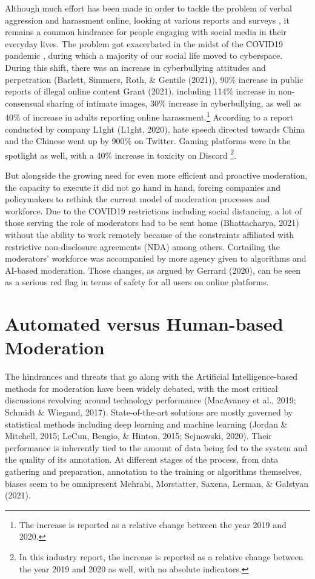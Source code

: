 \documentclass[
  10pt,
  dvipsnames,enabledeprecatedfontcommands]{scrartcl}
\begin{document}
Although much effort has been made in order to tackle the problem of
verbal aggression and harassment online, looking at various reports and
surveys , it remains a common hindrance for people engaging
with social media in their everyday lives. The problem got exacerbated
in the midst of the COVID19 pandemic ,
during which a majority of our social life moved to cyberspace. During
this shift, there was an increase in cyberbullying attitudes and
perpetration (Barlett, Simmers, Roth, \& Gentile (2021)), 90\% increase
in public reports of illegal online content Grant (2021), including
114\% increase in non-consensual sharing of intimate images, 30\%
increase in cyberbullying, as well as 40\% of increase in adults
reporting online
harassment.\footnote{The increase is reported as a relative change between the year 2019 and 2020.}
According to a report conducted by company L1ght (L1ght, 2020), hate
speech directed towards China and the Chinese went up by 900\% on
Twitter. Gaming platforms were in the spotlight as well, with a 40\%
increase in toxicity on Discord
\footnote{In this industry report, the increase is reported as a relative change between the year 2019 and 2020 as well, with no absolute indicators.}.

But alongside the growing need for even more efficient and proactive
moderation, the capacity to execute it did not go hand in hand, forcing
companies and policymakers to rethink the current model of moderation
processes and workforce. Due to the COVID19 restrictions including
social distancing, a lot of those serving the role of moderators had to
be sent home (Bhattacharya, 2021) without the ability to work remotely
because of the constraints affiliated with restrictive non-disclosure
agreements (NDA) among others. Curtailing the moderators' workforce was
accompanied by more agency given to algorithms and AI-based moderation.
Those changes, as argued by Gerrard (2020), can be seen as a serious red
flag in terms of safety for all users on online platforms.

\hypertarget{automated-versus-human-based-moderation}{%
\section{Automated versus Human-based
Moderation}\label{automated-versus-human-based-moderation}}

The hindrances and threats that go along with the Artificial
Intelligence-based methods for moderation have been widely debated, with
the most critical discussions revolving around technology performance
(MacAvaney et al., 2019; Schmidt \& Wiegand, 2017). State-of-the-art
solutions are mostly governed by statistical methods including deep
learning and machine learning (Jordan \& Mitchell, 2015; LeCun, Bengio,
\& Hinton, 2015; Sejnowski, 2020). Their performance is inherently tied
to the amount of data being fed to the system and the quality of its
annotation. At
different stages of the process, from data gathering and preparation,
annotation to the training or algorithms themselves, biases seem to be
omnipresent Mehrabi, Morstatter, Saxena, Lerman, \& Galstyan (2021).
\end{document}
